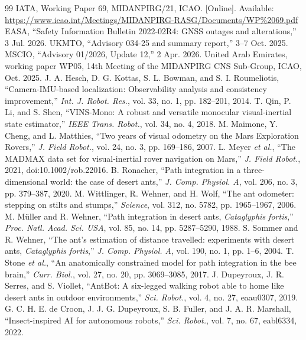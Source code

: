 \documentclass[conference]{IEEEtran}
\begin{document}
\begin{thebibliography}{99}
 IATA, Working Paper 69, MIDANPIRG/21, ICAO. [Online]. Available: \url{https://www.icao.int/Meetings/MIDANPIRG-RASG/Documents/WP\%2069.pdf}
 EASA, ``Safety Information Bulletin 2022-02R4: GNSS outages and alterations,'' 3 Jul. 2026.
 UKMTO, ``Advisory 034-25 and summary report,'' 3--7 Oct. 2025.
 MSCIO, ``Advisory 01/2026, Update 12,'' 2 Apr. 2026.
 United Arab Emirates, working paper WP05, 14th Meeting of the MIDANPIRG CNS Sub-Group, ICAO, Oct. 2025.
 J. A. Hesch, D. G. Kottas, S. L. Bowman, and S. I. Roumeliotis, ``Camera-IMU-based localization: Observability analysis and consistency improvement,'' \emph{Int. J. Robot. Res.}, vol. 33, no. 1, pp. 182--201, 2014.
 T. Qin, P. Li, and S. Shen, ``VINS-Mono: A robust and versatile monocular visual-inertial state estimator,'' \emph{IEEE Trans. Robot.}, vol. 34, no. 4, 2018.
 M. Maimone, Y. Cheng, and L. Matthies, ``Two years of visual odometry on the Mars Exploration Rovers,'' \emph{J. Field Robot.}, vol. 24, no. 3, pp. 169--186, 2007.
 L. Meyer \emph{et al.}, ``The MADMAX data set for visual-inertial rover navigation on Mars,'' \emph{J. Field Robot.}, 2021, doi:10.1002/rob.22016.
 B. Ronacher, ``Path integration in a three-dimensional world: the case of desert ants,'' \emph{J. Comp. Physiol. A}, vol. 206, no. 3, pp. 379--387, 2020.
 M. Wittlinger, R. Wehner, and H. Wolf, ``The ant odometer: stepping on stilts and stumps,'' \emph{Science}, vol. 312, no. 5782, pp. 1965--1967, 2006.
 M. M\"uller and R. Wehner, ``Path integration in desert ants, \emph{Cataglyphis fortis},'' \emph{Proc. Natl. Acad. Sci. USA}, vol. 85, no. 14, pp. 5287--5290, 1988.
 S. Sommer and R. Wehner, ``The ant's estimation of distance travelled: experiments with desert ants, \emph{Cataglyphis fortis},'' \emph{J. Comp. Physiol. A}, vol. 190, no. 1, pp. 1--6, 2004.
 T. Stone \emph{et al.}, ``An anatomically constrained model for path integration in the bee brain,'' \emph{Curr. Biol.}, vol. 27, no. 20, pp. 3069--3085, 2017.
 J. Dupeyroux, J. R. Serres, and S. Viollet, ``AntBot: A six-legged walking robot able to home like desert ants in outdoor environments,'' \emph{Sci. Robot.}, vol. 4, no. 27, eaau0307, 2019.
 G. C. H. E. de Croon, J. J. G. Dupeyroux, S. B. Fuller, and J. A. R. Marshall, ``Insect-inspired AI for autonomous robots,'' \emph{Sci. Robot.}, vol. 7, no. 67, eabl6334, 2022.

\end{thebibliography}
\end{document}
